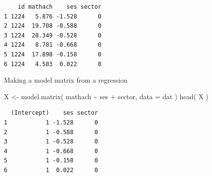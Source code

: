 \documentclass[
  letterpaper,
  DIV=11,
  numbers=noendperiod]{scrreprt}
\newenvironment{Shaded}{}{}
\newcommand{\AttributeTok}[1]{\textcolor[rgb]{0.49,0.56,0.16}{#1}}
\newcommand{\ConstantTok}[1]{\textcolor[rgb]{0.53,0.00,0.00}{#1}}
\newcommand{\DocumentationTok}[1]{\textcolor[rgb]{0.73,0.13,0.13}{\textit{#1}}}
\newcommand{\FunctionTok}[1]{\textcolor[rgb]{0.02,0.16,0.49}{#1}}
\newcommand{\NormalTok}[1]{#1}
\newcommand{\OtherTok}[1]{\textcolor[rgb]{0.00,0.44,0.13}{#1}}
\newcommand{\SpecialCharTok}[1]{\textcolor[rgb]{0.25,0.44,0.63}{#1}}
\newcommand{\StringTok}[1]{\textcolor[rgb]{0.25,0.44,0.63}{#1}}
\begin{document}
\begin{Shaded}
\end{Shaded}

\begin{verbatim}
    id mathach    ses sector
1 1224   5.876 -1.528      0
2 1224  19.708 -0.588      0
3 1224  20.349 -0.528      0
4 1224   8.781 -0.668      0
5 1224  17.898 -0.158      0
6 1224   4.583  0.022      0
\end{verbatim}

Making a model matrix from a regression

\begin{Shaded}
\begin{Highlighting}[]
\NormalTok{X }\OtherTok{\textless{}{-}} \FunctionTok{model.matrix}\NormalTok{( mathach }\SpecialCharTok{\textasciitilde{}}\NormalTok{ ses }\SpecialCharTok{+}\NormalTok{ sector, }\AttributeTok{data =}\NormalTok{ dat )}
\FunctionTok{head}\NormalTok{( X )}
\end{Highlighting}
\end{Shaded}

\begin{verbatim}
  (Intercept)    ses sector
1           1 -1.528      0
2           1 -0.588      0
3           1 -0.528      0
4           1 -0.668      0
5           1 -0.158      0
6           1  0.022      0
\end{verbatim}

\begin{Shaded}
\end{Shaded}
\end{document}

